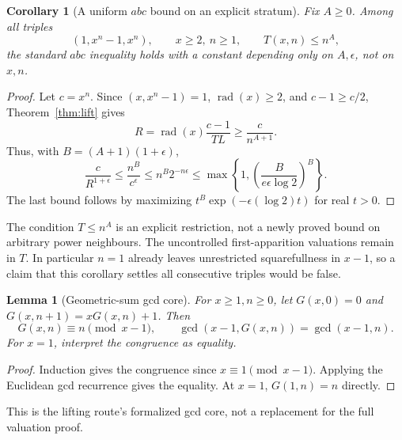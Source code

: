 \documentclass[11pt]{article}
\newtheorem{lemma}[theorem]{Lemma}
\newtheorem{corollary}[theorem]{Corollary}
\theoremstyle{definition}\newtheorem{definition}[theorem]{Definition}
\theoremstyle{remark}\newtheorem{remark}[theorem]{Remark}
\newcommand{\rad}{\operatorname{rad}}
\begin{document}
\begin{corollary}[A uniform \(abc\) bound on an explicit stratum]\label{cor:stratum}
Fix \(A\ge0\). Among all triples
\[
 (1,x^n-1,x^n),\qquad x\ge2,\ n\ge1,\qquad T(x,n)\le n^A,
\]
the standard \(abc\) inequality holds with a constant depending only on \(A,\epsilon\), not on \(x,n\).
\end{corollary}
\begin{proof}
Let \(c=x^n\). Since \((x,x^n-1)=1\), \(\rad(x)\ge2\), and \(c-1\ge c/2\), Theorem~\ref{thm:lift} gives
\[
 R=\rad(x)\frac{c-1}{TL}\ge\frac{c}{n^{A+1}}.
\]
Thus, with \(B=(A+1)(1+\epsilon)\),
\[
 \frac{c}{R^{1+\epsilon}}\le\frac{n^B}{c^\epsilon}
 \le n^B2^{-n\epsilon}\le
 \max\left\{1,\left(\frac{B}{e\epsilon\log2}\right)^B\right\}.
\]
The last bound follows by maximizing \(t^B\exp(-\epsilon(\log2)t)\) for real \(t>0\).
\end{proof}
The condition \(T\le n^A\) is an explicit restriction, not a newly proved bound on arbitrary power neighbours. The uncontrolled first-apparition valuations remain in \(T\). In particular \(n=1\) already leaves unrestricted squarefullness in \(x-1\), so a claim that this corollary settles all consecutive triples would be false.

\begin{lemma}[Geometric-sum gcd core]\label{lem:gcd}
For \(x\ge1,n\ge0\), let \(G(x,0)=0\) and \(G(x,n+1)=xG(x,n)+1\). Then
\[
 G(x,n)\equiv n\pmod{x-1},\qquad
 \gcd(x-1,G(x,n))=\gcd(x-1,n).
\]
For \(x=1\), interpret the congruence as equality.
\end{lemma}
\begin{proof}
Induction gives the congruence since \(x\equiv1\pmod{x-1}\). Applying the Euclidean gcd recurrence gives the equality. At \(x=1\), \(G(1,n)=n\) directly.
\end{proof}
This is the lifting route's formalized gcd core, not a replacement for the full valuation proof.
\end{document}
